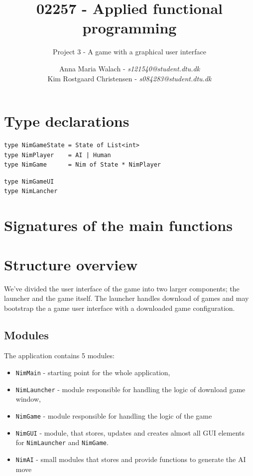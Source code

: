 \documentclass[10pt]{scrartcl}
\title{02257 - Applied functional programming}
\subtitle{Project 3 - A game with a graphical user interface}
\author{Anna Maria Walach - \textit {s121540@student.dtu.dk} \\ Kim Rostgaard Christensen - \textit {s084283@student.dtu.dk}}
\begin{document}
\maketitle
\section{Type declarations}
\begin{lstlisting}
type NimGameState = State of List<int>
type NimPlayer    = AI | Human
type NimGame      = Nim of State * NimPlayer
\end{lstlisting}

\begin{lstlisting}
type NimGameUI
type NimLancher
\end{lstlisting}

\section{Signatures of the main functions}


\section{Structure overview}
We've divided the user interface of the game into two larger components; the launcher and the game itself. The launcher handles download of games and may bootstrap the a game user interface with a downloaded game configuration.
\subsection{Modules}
The application contains 5 modules:
\begin{itemize}
\item \texttt{NimMain} - starting point for the whole application,
\item \texttt{NimLauncher} - module responsible for handling the logic of download game window,
\item \texttt{NimGame} - module responsible for handling the logic of the game
\item \texttt{NimGUI} - module, that stores, updates and creates almost all GUI elements for \texttt{NimLauncher} and \texttt{NimGame}.
\item \texttt{NimAI} - small modules that stores and provide functions to generate the AI move
\end{itemize}
\end{document}
